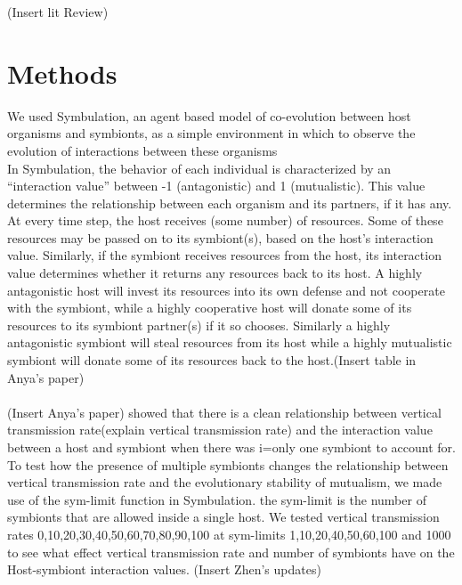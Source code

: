 \documentclass[letterpaper]{article}
\begin{document}
(Insert lit Review)

\section{Methods}

We used Symbulation, an agent based model of co-evolution between host organisms and symbionts, as a simple environment in which to observe the evolution of interactions between these organisms \citep{vostinar_SpatialStructureCan_2019}\\
In Symbulation, the behavior of each individual is characterized by an ``interaction value'' between -1 (antagonistic) and 1 (mutualistic).  This value determines the relationship between each organism and its partners, if it has any. At every time step, the host receives (some number) of resources. Some of these resources may be passed on to its symbiont(s), based on the host's interaction value. Similarly, if the symbiont receives resources from the host, its interaction value determines whether it returns any resources back to its host. A highly antagonistic host will invest its resources into its own defense and not cooperate with the symbiont, while a highly cooperative host will donate some of its resources to its symbiont partner(s) if it so chooses. Similarly a highly antagonistic symbiont will steal resources from its host while a highly mutualistic symbiont will donate some of its resources back to the host.(Insert table in Anya's paper)\\
\\
(Insert Anya's paper) showed that there is a clean relationship between vertical transmission rate(explain vertical transmission rate) and the interaction value between a host and symbiont when there was i=only one symbiont to account for. To test how the presence of multiple symbionts changes the relationship between vertical transmission rate and the evolutionary stability of mutualism, we made use of the sym-limit function in Symbulation. the sym-limit is the number of symbionts that are allowed inside a single host. We tested vertical transmission rates 0,10,20,30,40,50,60,70,80,90,100 at sym-limits 1,10,20,40,50,60,100 and 1000 to see what effect vertical transmission rate and number of symbionts have on the Host-symbiont interaction values.
(Insert Zhen's updates)
\end{document}
